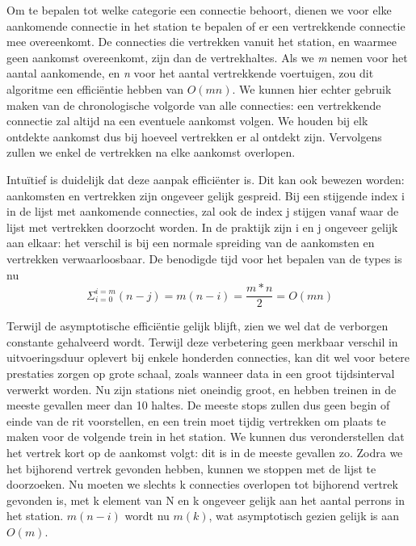 Om te bepalen tot welke categorie een connectie behoort, dienen we voor elke aankomende connectie in het station te bepalen of er een vertrekkende connectie mee overeenkomt. De connecties die vertrekken vanuit het station, en waarmee geen aankomst overeenkomt, zijn dan de vertrekhaltes. Als we \emph{m} nemen voor het aantal aankomende, en \emph{n} voor het aantal vertrekkende voertuigen, zou dit algoritme een efficiëntie hebben van $O(mn)$. We kunnen hier echter gebruik maken van de chronologische volgorde van alle connecties: een vertrekkende connectie zal altijd na een eventuele aankomst volgen. We houden bij elk ontdekte aankomst dus bij hoeveel vertrekken er al ontdekt zijn. Vervolgens zullen we enkel de vertrekken na elke aankomst overlopen.

Intuïtief is duidelijk dat deze aanpak efficiënter is. Dit kan ook bewezen worden: aankomsten en vertrekken zijn ongeveer gelijk gespreid. Bij een stijgende index i in de lijst met aankomende connecties, zal ook de index j stijgen vanaf waar de lijst met vertrekken doorzocht worden. In de praktijk zijn i en j ongeveer gelijk aan elkaar: het verschil is bij een normale spreiding van de aankomsten en vertrekken verwaarloosbaar. De benodigde tijd voor het bepalen van de types is nu 
\[
\Sigma^{i=m}_{i=0}(n-j) = m(n-i) = \frac{m*n}{2}=O(mn)
\]


Terwijl de asymptotische efficiëntie gelijk blijft, zien we wel dat de verborgen constante gehalveerd wordt. Terwijl deze verbetering geen merkbaar verschil in uitvoeringsduur oplevert bij enkele honderden connecties, kan dit wel voor betere prestaties zorgen op grote schaal, zoals wanneer data in een groot tijdsinterval verwerkt worden. 
Nu zijn stations niet oneindig groot, en hebben treinen in de meeste gevallen meer dan 10 haltes. De meeste stops zullen dus geen begin of einde van de rit voorstellen, en een trein moet tijdig vertrekken om plaats te maken voor de volgende trein in het station. We kunnen dus veronderstellen dat het vertrek kort op de aankomst volgt: dit is in de meeste gevallen zo. Zodra we het bijhorend vertrek gevonden hebben, kunnen we stoppen met de lijst te doorzoeken. Nu moeten we slechts k connecties overlopen tot bijhorend vertrek gevonden is, met k element van N en k ongeveer gelijk aan het aantal perrons in het station.
$m(n-i)$ wordt nu $m(k)$, wat asymptotisch gezien gelijk is aan $O(m)$.

